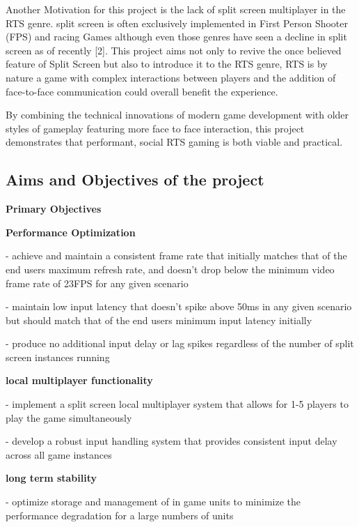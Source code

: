\documentclass[]{final_report}
\begin{document}
Another Motivation for this project is the lack of split screen multiplayer in the RTS genre. split screen is often exclusively implemented in First Person Shooter (FPS) and racing Games although even those genres have seen a decline in split screen as of recently [2]. This project aims not only to revive the once believed feature of Split Screen but also to introduce it to the RTS genre, RTS is by nature a game with complex interactions between players and the addition of face-to-face communication could overall benefit the experience. \newline

By combining the technical innovations of modern game development with older styles of gameplay featuring more face to face interaction, this project demonstrates that performant, social RTS gaming is both viable and practical.


\subsection{ Aims and Objectives of the project}

 \textbf{Primary Objectives} \newline

\textbf{ Performance Optimization} \newline

 - achieve and maintain a consistent frame rate that initially matches that of the end users maximum refresh rate, and doesn't drop below the minimum video frame rate of 23FPS for any given scenario 

 - maintain low input latency that doesn’t spike above 50ms in any given scenario but should match that of the end users minimum input latency initially

 - produce no additional input delay or lag spikes regardless of the number of split screen instances running

 \textbf{local multiplayer functionality} \newline

 - implement a split screen local multiplayer system that allows for 1-5 players to play the game simultaneously

 - develop a robust input handling system that provides consistent input delay across all game instances

 \textbf{long term stability} \newline

 - optimize storage and management of in game units to minimize the performance degradation for a large numbers of units
\end{document}
